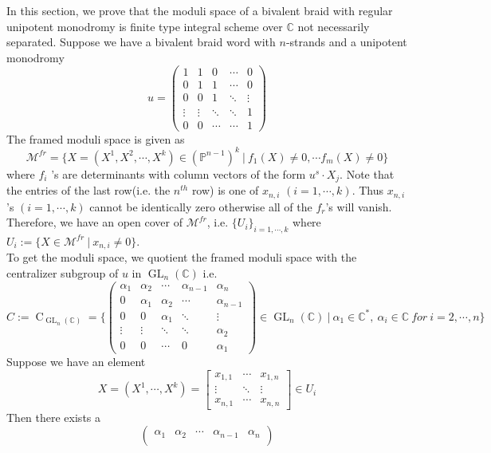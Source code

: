 \begin{example}
In this section, we prove that the moduli space of a bivalent braid with regular unipotent monodromy is finite type integral scheme over $\mathbb{C}$ not necessarily separated. Suppose we have a bivalent braid word with $n$-strands and a unipotent monodromy
\[
	u=
	\begin{pmatrix}
		1&1&0&\cdots&0\\
		0&1&1&\cdots&0\\
		0&0&1&\ddots&\vdots\\		
		\vdots&\vdots&\ddots&\ddots&1\\
		0&0&\cdots&\cdots&1
	\end{pmatrix}
\]
The framed moduli space is given as
\[
	\mathcal{M}^{fr}=\{X=(X^1,X^2,\cdots,X^k)\in (\mathbb{P}^{n-1})^k~|~	f_1(X)\neq0,\cdots f_m(X)\neq 0\}
\]
where $f_i$ 's are determinants with column vectors of the form $u^s \cdot X_j$. Note that the entries of the last row(i.e. the $n^{th}$ row) is one of $x_{n,i}$ $(i=1,\cdots, k)$. Thus $x_{n,i}$ 's $(i=1,\cdots,k)$ cannot be identically zero otherwise all of the $f_r$'s will vanish. Therefore, we have an open cover of $\mathcal{M}^{fr}$, i.e.  $\{ U_i \}_{i=1,\cdots,k}$ where $U_i:=\{X\in \mathcal{M}^{fr} ~|~ x_{n,i}\neq0\}$. \\
To get the moduli space, we quotient the framed moduli space with the centralizer subgroup of $u$ in $\operatorname{GL}_{n}(\mathbb{C})$ i.e.
\[
	C:=	
	\operatorname{C}_{\operatorname{GL}_n(\mathbb{C})}
	=\{	
	\begin{pmatrix}
		\alpha_1&\alpha_2&\cdots&\alpha_{n-1}&\alpha_n\\
		0&\alpha_1&\alpha_2&\cdots&\alpha_{n-1}\\
		0&0&\alpha_1&\ddots&\vdots\\		
		\vdots&\vdots&\ddots&\ddots&\alpha_2\\
		0&0&\cdots&0&\alpha_1
	\end{pmatrix}
	\in \operatorname{GL}_n(\mathbb{C})~|~\alpha_1\in \mathbb{C^*},~\alpha_i\in \mathbb{C}~for~i=2,\cdots,n  \}
\]
Suppose we have an element 
\[
	X=(X^1,\cdots,X^k)=
	\begin{bmatrix}
		x_{1,1}&\cdots&x_{1,n}\\
		\vdots&\ddots&\vdots\\
		x_{n,1}&\cdots&x_{n,n}
	\end{bmatrix}
	\in U_i
\]
Then there exists a 
\[
	\begin{pmatrix}
		\alpha_1&\alpha_2&\cdots&\alpha_{n-1}&\alpha_n\\

\end{pmatrix}\]
\end{example}
